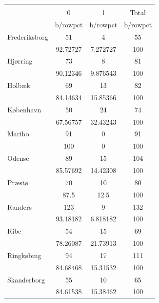 {
\def\sym#1{\ifmmode^{#1}\else\(^{#1}\)\fi}
\begin{tabular}{l*{3}{c}}
\toprule
                    &\multicolumn{3}{c}{}                  \\
                    &           0&           1&       Total\\
                    &    b/rowpct&    b/rowpct&    b/rowpct\\
\midrule
Frederiksborg       &          51&           4&          55\\
                    &    92.72727&    7.272727&         100\\
Hjørring            &          73&           8&          81\\
                    &    90.12346&    9.876543&         100\\
Holbæk              &          69&          13&          82\\
                    &    84.14634&    15.85366&         100\\
København           &          50&          24&          74\\
                    &    67.56757&    32.43243&         100\\
Maribo              &          91&           0&          91\\
                    &         100&           0&         100\\
Odense              &          89&          15&         104\\
                    &    85.57692&    14.42308&         100\\
Præstø              &          70&          10&          80\\
                    &        87.5&        12.5&         100\\
Randers             &         123&           9&         132\\
                    &    93.18182&    6.818182&         100\\
Ribe                &          54&          15&          69\\
                    &    78.26087&    21.73913&         100\\
Ringkøbing          &          94&          17&         111\\
                    &    84.68468&    15.31532&         100\\
Skanderborg         &          55&          10&          65\\
                    &    84.61538&    15.38462&         100\\

\end{tabular}}
